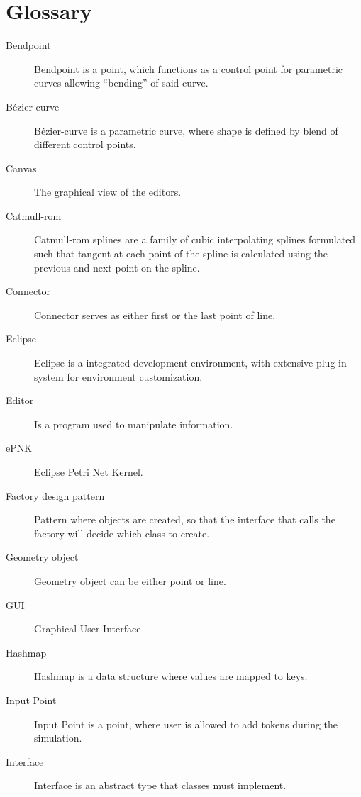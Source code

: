 \section{Glossary}
\begin{description}

\item [Bendpoint] Bendpoint is a point, which functions as a control point for parametric curves allowing “bending” of said curve.

\item [Bézier-curve] Bézier-curve is a parametric curve, where shape is defined by blend of different control points.

\item [Canvas] The graphical view of the editors.

\item [Catmull-rom] Catmull-rom splines are a family of cubic interpolating splines formulated such that tangent at each point of the spline is calculated using the previous and next point on the spline. 

\item [Connector] Connector serves as either first or the last point of line.

\item [Eclipse] Eclipse is a integrated development environment, with extensive plug-in system for environment customization.

\item [Editor] Is a program used to manipulate information.

\item [ePNK] Eclipse Petri Net Kernel.

\item [Factory design pattern] Pattern where objects are created, so that the interface that calls the factory will decide which class to create.

\item [Geometry object] Geometry object can be either point or line.

\item [GUI] Graphical User Interface

\item [Hashmap] Hashmap is a data structure where values are mapped to keys.

\item [Input Point] Input Point is a point, where user is allowed to add tokens during the simulation.

\item [Interface] Interface is an abstract type that classes must implement.


\end{description}
